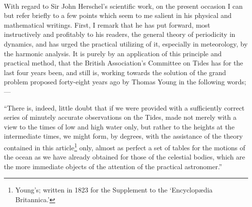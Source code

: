 \documentclass[a4paper, 11pt, oneside, english]{article}
\begin{document}
\paragraph{}
With regard to Sir John Herschel's scientific work, on the present occasion I can but refer briefly to a few points which seem to me salient in his physical and mathematical writings. First, I remark that he has put forward, most instructively and profitably to his readers, the general theory of periodicity in dynamics, and has urged the practical utilizing of it, especially in meteorology, by the harmonic analysis. It is purely by an application of this principle and practical method, that the British Association's Committee on Tides has for the last four years been, and still is, working towards the solution of the grand problem proposed forty-eight years ago by Thomas Young in the following words;---

``There is, indeed, little doubt that if we were provided with a sufficiently correct series of minutely accurate observations on the Tides, made not merely with a view to the times of low and high water only, but rather to the heights at the intermediate times, we might form, by degrees, with the assistance of the theory contained in this article\footnote{Young's; written in 1823 for the Supplement to the `Encyclopædia Britannica.'} only, almost as perfect a set of tables for the motions of the ocean as we have already obtained for those of the celestial bodies, which are the more immediate objects of the attention of the practical astronomer.''
\end{document}
